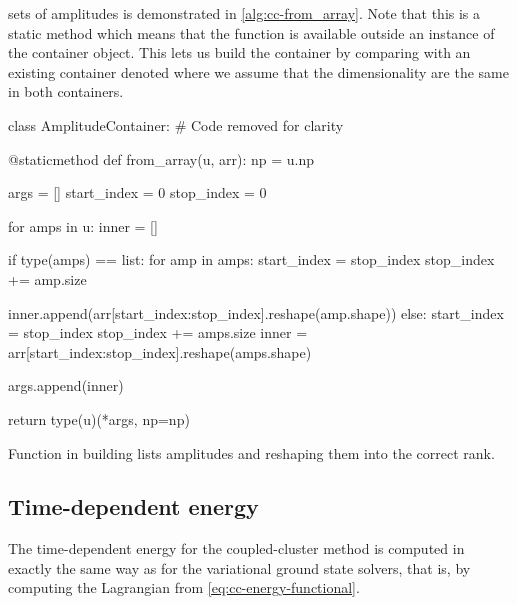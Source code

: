             sets of amplitudes is demonstrated in \autoref{alg:cc-from_array}.
            Note that this is a static method which means that the function is
            available outside an instance of the container object.
            This lets us build the container by comparing with an existing
            container denoted  where we assume that the dimensionality
            are the same in both containers.
            \begin{algorithm}
                \begin{python}
class AmplitudeContainer:
    # Code removed for clarity

    @staticmethod
    def from_array(u, arr):
        np = u.np

        args = []
        start_index = 0
        stop_index = 0

        for amps in u:
            inner = []

            if type(amps) == list:
                for amp in amps:
                    start_index = stop_index
                    stop_index += amp.size

                    inner.append(arr[start_index:stop_index].reshape(amp.shape))
            else:
                start_index = stop_index
                stop_index += amps.size
                inner = arr[start_index:stop_index].reshape(amps.shape)

            args.append(inner)

        return type(u)(*args, np=np)
                \end{python}
                \caption{Function in  building lists
                amplitudes and reshaping them into the correct rank.}
                \label{alg:cc-from_array}
            \end{algorithm}

        \subsection{Time-dependent energy}
            The time-dependent energy for the coupled-cluster method is computed
            in exactly the same way as for the variational ground state solvers,
            that is, by computing the Lagrangian from
            \autoref{eq:cc-energy-functional}.

